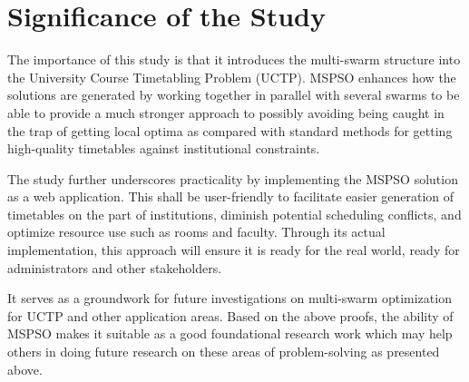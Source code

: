 \section{Significance of the Study}
\label{sec:significance}

The importance of this study is that it introduces the multi-swarm structure into the University Course Timetabling Problem (UCTP). MSPSO enhances how the solutions are generated by working together in parallel with several swarms to be able to provide a much stronger approach to possibly avoiding being caught in the trap of getting local optima as compared with standard methods for getting high-quality timetables against institutional constraints.

The study further underscores practicality by implementing the MSPSO solution as a web application. This shall be user-friendly to facilitate easier generation of timetables on the part of institutions, diminish potential scheduling conflicts, and optimize resource use such as rooms and faculty. Through its actual implementation, this approach will ensure it is ready for the real world, ready for administrators and other stakeholders.

It serves as a groundwork for future investigations on multi-swarm optimization for UCTP and other application areas. Based on the above proofs, the ability of MSPSO makes it suitable as a good foundational research work which may help others in doing future research on these areas of problem-solving as presented above.

